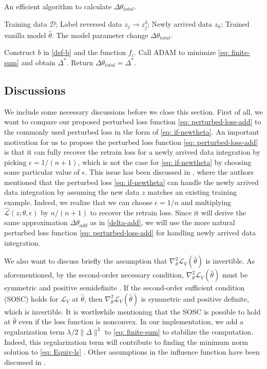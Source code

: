 \begin{algorithm}[htbp]
\caption{An efficient algorithm to calculate $\Delta\theta_{total}$.}\label{alg1}
\begin{algorithmic}[1]
 Training data $\mathcal{D}$; Label reversed data $z_j \rightarrow z_j^{\delta}$; Newly arrived data $z_k$; Trained vanilla model $\hat{\theta}$.
 The model parameter change $\Delta\theta_{total}$.

 Construct $b$ in \eqref{def-b} and the function $f_i$.
\STATE Call ADAM to minimize \eqref{eq: finite-sum} and obtain $\Delta^*$.
 \STATE Return $\Delta\theta_{total} = \Delta^*$.
\end{algorithmic}
\end{algorithm}
\subsection{Discussions}
We include some necessary discussions before we close this section. First of all, we want to compare our proposed perturbed loss function \eqref{eq: perturbed-loss-add} to the commonly used perturbed loss in the form of \eqref{eq: if-newtheta}.
An important motivation for us to propose the perturbed loss function \eqref{eq: perturbed-loss-add} is that it can fully recover the retrain loss for a newly arrived data integration by picking $\epsilon = 1/(n+1)$, which is not the case for \eqref{eq: if-newtheta} by choosing some particular value of $\epsilon$. This issue has been discussed in \cite{grosse2023studying}, where the authors mentioned that the perturbed loss \eqref{eq: if-newtheta} can handle the newly arrived data integration by assuming the new data $z$ matches an existing training example. Indeed, we realize that we can choose $\epsilon = 1/n$ and multiplying $\widehat{\mathcal{L}}(z; \theta, \epsilon)$ by $n/(n+1)$ to recover the retrain loss. Since it will derive the same approximation $\Delta\theta_{add}$ as in \eqref{delta-add}, we will use the more natural perturbed loss function \eqref{eq: perturbed-loss-add} for handling newly arrived data integration.

We also want to discuss briefly the assumption that $\nabla^2_{\theta}\mathcal{L}_V(\hat{\theta})$ is invertible. As aforementioned, by the second-order necessary condition, $\nabla^2_{\theta}\mathcal{L}_V(\hat{\theta})$ must be symmetric and positive semidefinite \cite{nocedal1999numerical}. If the second-order sufficient condition (SOSC) holds for $\mathcal{L}_V$ at $\hat{\theta}$, then $\nabla^2_{\theta}\mathcal{L}_V(\hat{\theta})$ is symmetric and positive definite, which is invertible. It is worthwhile mentioning that the SOSC is possible to hold at $\hat{\theta}$ even if the loss function is nonconvex. In our implementation, we add a regularization term $\lambda/2\|\Delta\|^2$ to \eqref{eq: finite-sum} to stabilize the computation. Indeed, this regularization term will contribute to finding the minimum norm solution to \eqref{eq: Equiv-ls} \cite{facchinei2003finite}. Other assumptions in the influence function have been discussed in \cite{koh2017understanding,schioppa2024theoretical}. 